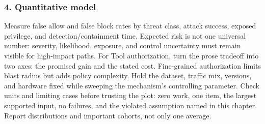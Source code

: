 \subsubsection*{4. Quantitative model}
Measure false allow and false block rates by threat class, attack success, exposed privilege, and detection/containment time. Expected risk is not one universal number: severity, likelihood, exposure, and control uncertainty must remain visible for high-impact paths.
For Tool authorization, turn the prose tradeoff into two axes: the promised gain and the stated cost. Fine-grained authorization limits blast radius but adds policy complexity. Hold the dataset, traffic mix, versions, and hardware fixed while sweeping the mechanism's controlling parameter.
Check units and limiting cases before trusting the plot: zero work, one item, the largest supported input, no failures, and the violated assumption named in this chapter. Report distributions and important cohorts, not only one average.
